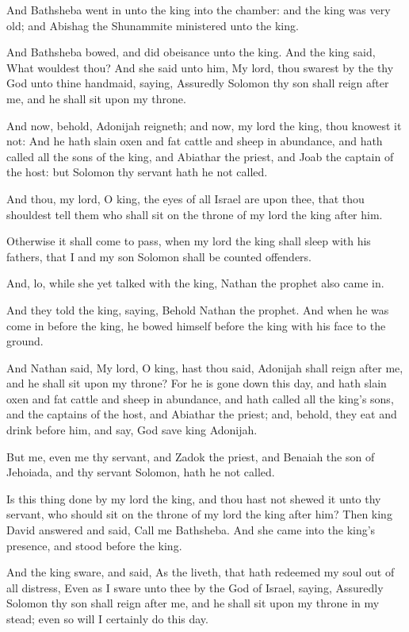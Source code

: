 \verse And Bathsheba went in unto the king into the chamber: and the king was very old; and Abishag the Shunammite ministered unto the king.

\verse And Bathsheba bowed, and did obeisance unto the king. And the king said, What wouldest thou?  \verse And she said unto him, My lord, thou swarest by the \LORD thy God unto thine handmaid, saying, Assuredly Solomon thy son shall reign after me, and he shall sit upon my throne.

\verse And now, behold, Adonijah reigneth; and now, my lord the king, thou knowest it not: \verse And he hath slain oxen and fat cattle and sheep in abundance, and hath called all the sons of the king, and Abiathar the priest, and Joab the captain of the host: but Solomon thy servant hath he not called.

\verse And thou, my lord, O king, the eyes of all Israel are upon thee, that thou shouldest tell them who shall sit on the throne of my lord the king after him.

\verse Otherwise it shall come to pass, when my lord the king shall sleep with his fathers, that I and my son Solomon shall be counted offenders.

\verse And, lo, while she yet talked with the king, Nathan the prophet also came in.

\verse And they told the king, saying, Behold Nathan the prophet. And when he was come in before the king, he bowed himself before the king with his face to the ground.

\verse And Nathan said, My lord, O king, hast thou said, Adonijah shall reign after me, and he shall sit upon my throne?  \verse For he is gone down this day, and hath slain oxen and fat cattle and sheep in abundance, and hath called all the king's sons, and the captains of the host, and Abiathar the priest; and, behold, they eat and drink before him, and say, God save king Adonijah.

\verse But me, even me thy servant, and Zadok the priest, and Benaiah the son of Jehoiada, and thy servant Solomon, hath he not called.

\verse Is this thing done by my lord the king, and thou hast not shewed it unto thy servant, who should sit on the throne of my lord the king after him?  \verse Then king David answered and said, Call me Bathsheba.  And she came into the king's presence, and stood before the king.

\verse And the king sware, and said, As the \LORD liveth, that hath redeemed my soul out of all distress, \verse Even as I sware unto thee by the \LORD God of Israel, saying, Assuredly Solomon thy son shall reign after me, and he shall sit upon my throne in my stead; even so will I certainly do this day.

